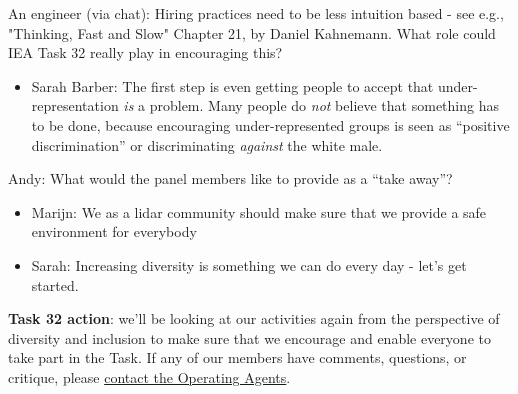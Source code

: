 An engineer (via chat): Hiring practices need to be less intuition based - see e.g., "Thinking, Fast and Slow" Chapter 21, by Daniel Kahnemann\cite{kahneman2011thinking}. What role could IEA Task 32 really play in encouraging this?

\begin{itemize}
	\item Sarah Barber: The first step is even getting people to accept that under-representation \emph{is} a problem. Many people do \emph{not} believe that something has to be done, because encouraging under-represented groups is seen as \enquote{positive discrimination} or discriminating \emph{against} the white male.
\end{itemize}

Andy: What would the panel members like to provide as a \enquote{take away}?

\begin{itemize}
	\item Marijn: We as a lidar community should make sure that we provide a safe environment for everybody
	\item Sarah: Increasing diversity is something we can do every day - let's get started.
\end{itemize}


\textbf{Task 32 action}: we'll be looking at our activities again from the perspective of diversity and inclusion to make sure that we encourage and enable everyone to take part in the Task. If any of our members have comments, questions, or critique, please \href{mailto:ieawind.task32@ifb.uni-stuttgart.de}{contact the Operating Agents}.